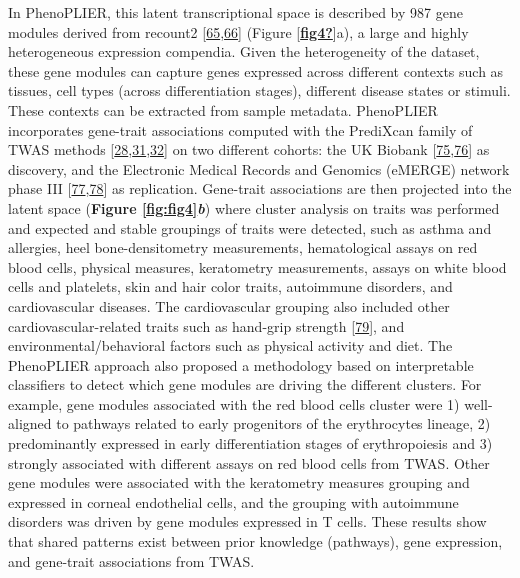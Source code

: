 In PhenoPLIER, this latent transcriptional space is described by 987 gene modules derived from recount2 {[}\protect\hyperlink{ref-14rnBunuZ}{65},\protect\hyperlink{ref-6SPTvFXq}{66}{]} (Figure {[}\protect\hyperlink{ref-fig4}{\textbf{fig4?}}{]}a), a large and highly heterogeneous expression compendia.
Given the heterogeneity of the dataset, these gene modules can capture genes expressed across different contexts such as tissues, cell types (across differentiation stages), different disease states or stimuli.
These contexts can be extracted from sample metadata.
PhenoPLIER incorporates gene-trait associations computed with the PrediXcan family of TWAS methods {[}\protect\hyperlink{ref-Z8bvDdVq}{28},\protect\hyperlink{ref-vLyTudUB}{31},\protect\hyperlink{ref-1FFzCXo1s}{32}{]} on two different cohorts: the UK Biobank {[}\protect\hyperlink{ref-nmJxPpE5}{75},\protect\hyperlink{ref-lY5ln3dB}{76}{]} as discovery, and the Electronic Medical Records and Genomics (eMERGE) network phase III {[}\protect\hyperlink{ref-wfqjCerX}{77},\protect\hyperlink{ref-gZAOkumx}{78}{]} as replication.
Gene-trait associations are then projected into the latent space (\textbf{Figure \ref{fig:fig4}\emph{b}}) where cluster analysis on traits was performed and expected and stable groupings of traits were detected, such as asthma and allergies, heel bone-densitometry measurements, hematological assays on red blood cells, physical measures, keratometry measurements, assays on white blood cells and platelets, skin and hair color traits, autoimmune disorders, and cardiovascular diseases.
The cardiovascular grouping also included other cardiovascular-related traits such as hand-grip strength {[}\protect\hyperlink{ref-WIZh9VF9}{79}{]}, and environmental/behavioral factors such as physical activity and diet.
The PhenoPLIER approach also proposed a methodology based on interpretable classifiers to detect which gene modules are driving the different clusters.
For example, gene modules associated with the red blood cells cluster were 1) well-aligned to pathways related to early progenitors of the erythrocytes lineage, 2) predominantly expressed in early differentiation stages of erythropoiesis and 3) strongly associated with different assays on red blood cells from TWAS.
Other gene modules were associated with the keratometry measures grouping and expressed in corneal endothelial cells, and the grouping with autoimmune disorders was driven by gene modules expressed in T cells.
These results show that shared patterns exist between prior knowledge (pathways), gene expression, and gene-trait associations from TWAS.

